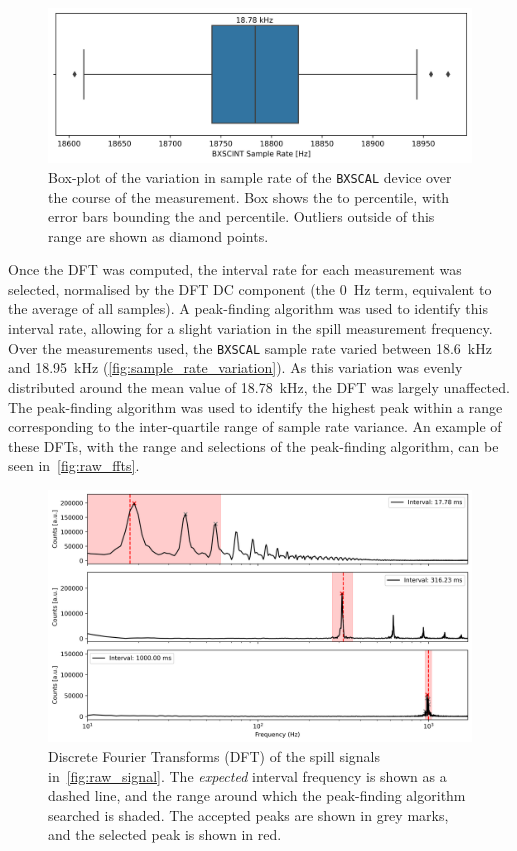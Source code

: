 \documentclass[11pt]{report}
\begin{document}
\begin{figure}
  \centering
  \includegraphics*[width=0.8\linewidth]{sample_rate_variation.png}
  \caption{Box-plot of the variation in sample rate of the \texttt{BXSCAL} device over the course of the measurement. Box shows the  to  percentile, with error bars bounding the  and  percentile. Outliers outside of this range are shown as diamond points.}\label{fig:sample_rate_variation}
\end{figure} %

Once the DFT was computed, the interval rate for each measurement was selected, normalised by the DFT DC component (the \qty{0}{\hertz} term, equivalent to the average of all samples). A peak-finding algorithm was used to identify this interval rate, allowing for a slight variation in the spill measurement frequency. Over the measurements used, the \verb|BXSCAL| sample rate varied between \qty{18.6}{\kilo\hertz} and \qty{18.95}{\kilo\hertz} (\autoref{fig:sample_rate_variation}). As this variation was evenly distributed around the mean value of \qty{18.78}{\kilo\hertz}, the DFT was largely unaffected. The peak-finding algorithm was used to identify the highest peak within a range corresponding to the inter-quartile range of sample rate variance. An example of these DFTs, with the range and selections of the peak-finding algorithm, can be seen in~\autoref{fig:raw_ffts}.

\begin{figure}
  \centering
  \includegraphics*[width=0.8\linewidth]{raw_ffts.png}
  \caption{Discrete Fourier Transforms (DFT) of the spill signals in~\autoref{fig:raw_signal}. The \textit{expected} interval frequency is shown as a dashed line, and the range around which the peak-finding algorithm searched is shaded. The accepted peaks are shown in grey marks, and the selected peak is shown in red.}\label{fig:raw_ffts}
\end{figure}
\end{document}
